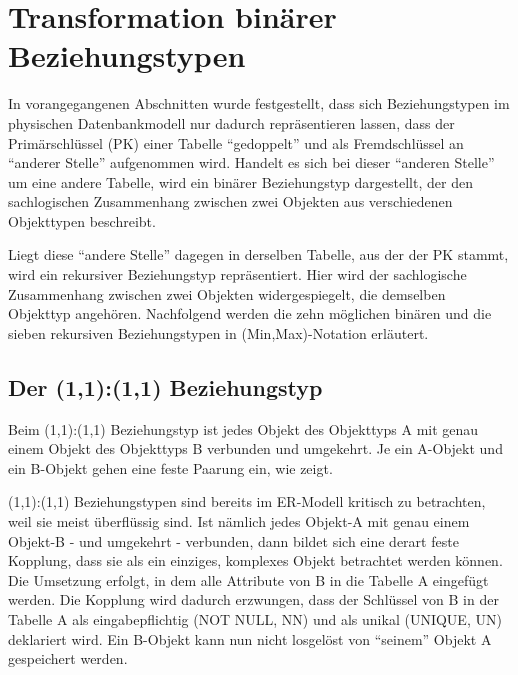 \section{Transformation binärer Beziehungstypen}
In vorangegangenen Abschnitten wurde festgestellt, dass sich Beziehungstypen im physischen Datenbankmodell nur dadurch repräsentieren lassen, dass der Primärschlüssel (PK) einer Tabelle \enquote{gedoppelt} und als Fremdschlüssel an \enquote{anderer Stelle} aufgenommen wird. Handelt es sich bei dieser \enquote{anderen Stelle} um eine andere Tabelle, wird ein binärer Beziehungstyp dargestellt, der den sachlogischen Zusammenhang zwischen zwei Objekten aus verschiedenen Objekttypen beschreibt.

Liegt diese \enquote{andere Stelle} dagegen in derselben Tabelle, aus der der PK stammt, wird ein rekursiver Beziehungstyp repräsentiert. Hier wird der sachlogische Zusammenhang zwischen zwei Objekten widergespiegelt, die demselben Objekttyp angehören. Nachfolgend werden die zehn möglichen binären und die sieben rekursiven Beziehungstypen in (Min,Max)-Notation erläutert.
\subsection{Der (1,1):(1,1) Beziehungstyp}
Beim (1,1):(1,1) Beziehungstyp ist jedes Objekt des Objekttyps A mit genau einem Objekt des Objekttyps B verbunden und umgekehrt. Je ein A-Objekt und ein B-Objekt gehen eine feste Paarung ein, wie  zeigt. %

\begin{center}
\end{center}
(1,1):(1,1) Beziehungstypen sind bereits im ER-Modell kritisch zu betrachten, weil sie meist über\-flüs\-sig sind. Ist nämlich jedes Objekt-A mit genau einem Objekt-B - und umgekehrt - verbunden, dann bildet sich eine derart feste Kopplung, dass sie als ein einziges, komplexes Objekt betrachtet werden können. Die Umsetzung erfolgt, in dem alle Attribute von B in die Tabelle A eingefügt werden. Die Kopplung wird dadurch erzwungen, dass der Schlüssel von B in der Tabelle A als eingabepflichtig (NOT NULL, NN) und als unikal (UNIQUE, UN) deklariert wird. Ein B-Objekt kann nun nicht losgelöst von \enquote{seinem} Objekt A gespeichert werden.

